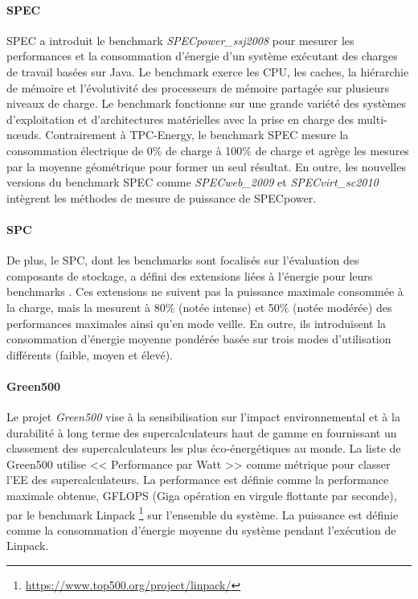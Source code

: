 \paragraph{SPEC}
SPEC a introduit le benchmark \textit{SPECpower\_ssj2008} \cite{SPECpowerssj2008} pour mesurer les performances et la consommation d'énergie d'un système exécutant des charges de travail basées sur Java. Le benchmark exerce les CPU, les caches, la hiérarchie de mémoire et l'évolutivité des processeurs de mémoire partagée sur plusieurs niveaux de charge. Le benchmark fonctionne sur une grande variété des systèmes d'exploitation et d'architectures matérielles avec la prise en charge des multi-nœuds. Contrairement à TPC-Energy, le benchmark SPEC mesure la consommation électrique de 0\% de charge à 100\% de charge et agrège les mesures par la moyenne géométrique pour former un seul résultat. En outre, les nouvelles versions du benchmark SPEC comme \textit{SPECweb\_2009} et \textit{SPECvirt\_sc2010} intègrent les méthodes de mesure de puissance de SPECpower.

\paragraph{SPC}
De plus, le SPC, dont les benchmarks sont focalisés sur l'évaluation des composants de stockage, a défini des extensions liées à l'énergie pour leurs benchmarks \cite{SPCBenchmark}. Ces extensions ne suivent pas la puissance maximale consommée à la charge, mais la mesurent à 80\% (notée intense) et 50\% (notée modérée) des performances maximales ainsi qu'en mode veille. En outre, ils introduisent la consommation d'énergie moyenne pondérée basée sur trois modes d'utilisation différents (faible, moyen et élevé).

\paragraph{Green500}
Le projet \textit{Green500} \cite{Green500} vise à la sensibilisation sur l'impact environnemental et à la durabilité à long terme des supercalculateurs haut de gamme en fournissant un classement des supercalculateurs les plus éco-énergétiques au monde. La liste de Green500 utilise << Performance par Watt >> comme métrique pour classer l'EE des supercalculateurs. La performance est définie comme la performance maximale obtenue, GFLOPS (Giga opération en virgule flottante par seconde), par le benchmark Linpack \footnote{\url{https://www.top500.org/project/linpack/}} sur l'ensemble du système. La puissance est définie comme la consommation d'énergie moyenne du système pendant l'exécution de Linpack.

